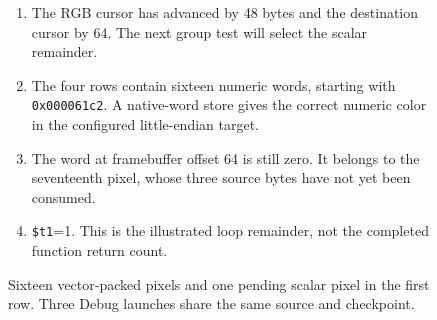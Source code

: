 \begin{figure}[htbp]
  \par\smallskip
  \begin{minipage}{\linewidth}
    \small
    \begin{enumerate}
      \item The RGB cursor has advanced by 48 bytes and the destination cursor by 64. The next group test will select the scalar remainder.
      \item The four rows contain sixteen numeric words, starting with \texttt{0x000061c2}. A native-word store gives the correct numeric color in the configured little-endian target.
      \item The word at framebuffer offset 64 is still zero. It belongs to the seventeenth pixel, whose three source bytes have not yet been consumed.
      \item \texttt{\$t1}=1. This is the illustrated loop remainder, not the completed function return count.
    \end{enumerate}
  \end{minipage}
  \caption{Sixteen vector-packed pixels and one pending scalar pixel in the first row. Three Debug launches share the same source and checkpoint.}
  \label{fig:png-vector-packing}
\end{figure}
